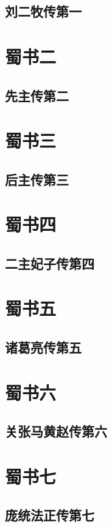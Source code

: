 \documentclass[12pt,UTF8]{ctexbook}
\begin{document}
\chapter{刘二牧传第一}

\part{蜀书二}
\chapter{先主传第二}

\part{蜀书三}
\chapter{后主传第三}

\part{蜀书四}
\chapter{二主妃子传第四}

\part{蜀书五}
\chapter{诸葛亮传第五}

\part{蜀书六}
\chapter{关张马黄赵传第六}

\part{蜀书七}
\chapter{庞统法正传第七}
\end{document}
